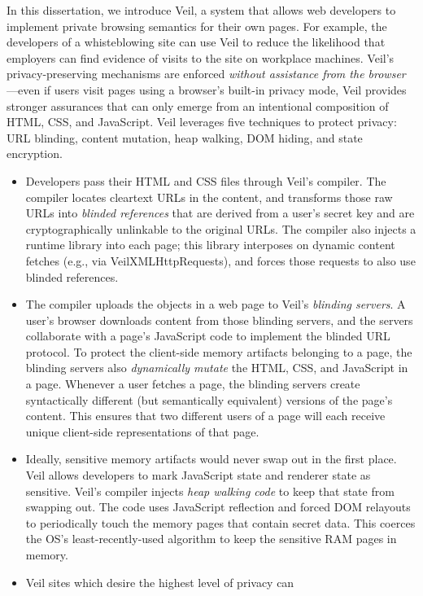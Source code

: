 In this dissertation, we introduce Veil, a system
that allows web developers to implement
private browsing semantics for their own pages.
For example, the developers of a whisteblowing
site can use Veil to reduce the likelihood
that employers can find evidence of visits to
the site on workplace machines.
Veil's privacy-preserving mechanisms are
enforced \emph{without assistance from the
	browser}---even if users visit pages using
a browser's built-in privacy mode, Veil
provides stronger assurances that
can only emerge from an intentional
composition of HTML, CSS, and JavaScript.
Veil leverages five techniques to protect
privacy: URL blinding, content mutation,
heap walking, DOM hiding, and state encryption.
\begin{itemize}
	\item Developers pass their HTML and CSS files through
	Veil's compiler. The compiler locates cleartext
	URLs in the content, and transforms those raw
	URLs into \emph{blinded references} that are
	derived from a user's secret key and are
	cryptographically unlinkable to the original
	URLs. The compiler also injects a runtime
	library into each page; this library interposes
	on dynamic content fetches (e.g., via
	Veil{XMLHttpRequests}), and forces those
	requests to also use blinded references.
	\item The compiler uploads the objects in a web page to
	Veil's \emph{blinding servers}. A user's browser
	downloads content from those blinding servers, and
	the servers collaborate with a page's JavaScript
	code to implement the blinded URL protocol. To
	protect the client-side memory artifacts belonging
	to a page, the blinding servers also \emph{dynamically
		mutate} the HTML, CSS, and JavaScript in a page.
	Whenever a user fetches a page, the blinding servers
	create syntactically different (but semantically
	equivalent) versions of the page's content. This
	ensures that two different users of a page will
	each receive unique client-side representations
	of that page.
	\item Ideally, sensitive memory artifacts would never
	swap out in the first place. Veil allows developers
	to mark JavaScript state and renderer state as
	sensitive. Veil's compiler injects \emph{heap
		walking code} to keep that state from swapping out.
	The code uses JavaScript reflection
	and forced DOM relayouts to periodically touch the
	memory pages that contain secret data. This coerces
	the OS's least-recently-used algorithm to keep the
	sensitive RAM pages in memory.
	\item Veil sites which desire the highest level of privacy can

\end{itemize}
